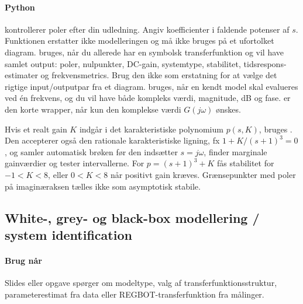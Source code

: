 \paragraph{Python}
 kontrollerer poler efter din udledning.
Angiv koefficienter i faldende potenser af \(s\). Funktionen erstatter ikke modelleringen
og må ikke bruges på et ufortolket diagram.
 bruges, når du allerede har en
symbolsk transferfunktion og vil have samlet output: poler, nulpunkter, DC-gain,
systemtype, stabilitet, tidsrespons-estimater og frekvensmetrics. Brug den ikke som
erstatning for at vælge det rigtige input/outputpar fra et diagram.
 bruges, når en kendt model skal
evalueres ved én frekvens, og du vil have både kompleks værdi, magnitude, dB og fase.
 er den korte wrapper, når kun
den komplekse værdi \(G(j\omega)\) ønskes.

Hvis et realt gain \(K\) indgår i det karakteristiske polynomium \(p(s,K)\), bruges
. Den accepterer også den rationale
karakteristiske ligning, fx \(1+K/(s+1)^3=0\), og samler automatisk brøken før
den indsætter \(s=j\omega\), finder marginale gainværdier og tester intervallerne. For
\(p=(s+1)^3+K\) fås stabilitet for \(-1<K<8\), eller \(0<K<8\) når positivt gain
kræves. Grænsepunkter med poler på imaginæraksen tælles ikke som asymptotisk stabile.

\subsection{White-, grey- og black-box modellering / system identification}
\label{sec:modelling-types}

\paragraph{Brug når}
Slides eller opgave spørger om modeltype, valg af transferfunktionsstruktur,
parameterestimat fra data eller REGBOT-transferfunktion fra målinger.

